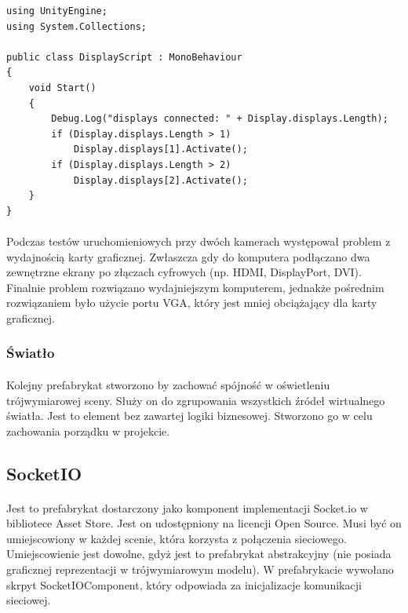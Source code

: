 \begin{lstlisting}[language=CSharp]
using UnityEngine;
using System.Collections;

public class DisplayScript : MonoBehaviour
{
	void Start()
	{
		Debug.Log("displays connected: " + Display.displays.Length);
		if (Display.displays.Length > 1)
			Display.displays[1].Activate();
		if (Display.displays.Length > 2)
			Display.displays[2].Activate();
	}
}
\end{lstlisting}

\paragraph{}
Podczas testów uruchomieniowych przy dwóch kamerach występował problem z wydajnością karty graficznej. Zwłaszcza gdy do komputera podłączano dwa zewnętrzne ekrany po złączach cyfrowych (np. HDMI, DisplayPort, DVI). Finalnie problem rozwiązano wydajniejszym komputerem, jednakże pośrednim rozwiązaniem było użycie portu VGA, który jest mniej obciążający dla karty graficznej.

\subsubsection{Światło}
\paragraph{}
Kolejny prefabrykat stworzono by zachować spójność w oświetleniu trójwymiarowej sceny. Służy on do zgrupowania wszystkich źródeł wirtualnego światła. Jest to element bez zawartej logiki biznesowej. Stworzono go w celu zachowania porządku w projekcie.


\subsection{SocketIO}
\paragraph{}
Jest to prefabrykat dostarczony jako komponent implementacji Socket.io w bibliotece Asset Store. Jest on udostępniony na licencji Open Source.  Musi być on umiejscowiony w każdej scenie, która korzysta z połączenia sieciowego. Umiejscowienie jest dowolne, gdyż jest to prefabrykat abstrakcyjny (nie posiada graficznej reprezentacji w trójwymiarowym modelu). W prefabrykacie wywołano skrpyt SocketIOComponent, który odpowiada za inicjalizacje komunikacji sieciowej.

